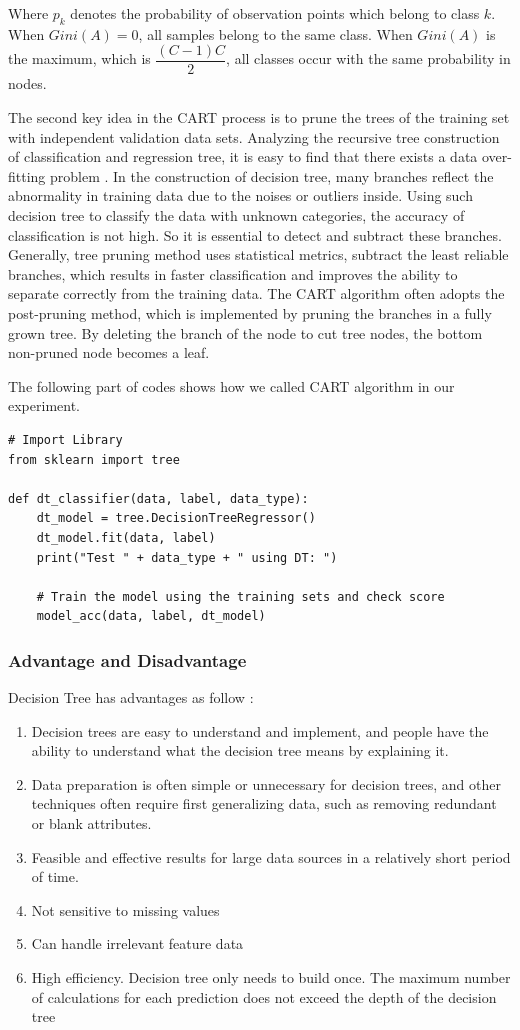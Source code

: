 \documentclass[sigconf]{acmart}
\begin{document}
Where $p_{k}$ denotes the probability of observation points which belong to class $k$. When $Gini(A)=0$, all samples belong to the same class. When $Gini(A)$ is the maximum, which is $\dfrac{(C-1)C}{2}$, all classes occur with the same probability in nodes.

The second key idea in the CART process is to prune the trees of the training set with independent validation data sets. Analyzing the recursive tree construction of classification and regression tree, it is easy to find that there exists a data over-fitting problem \cite{cart}. In the construction of decision tree, many branches reflect the abnormality in training data due to the noises or outliers inside. Using such decision tree to classify the data with unknown categories, the accuracy of classification is not high. So it is essential to detect and subtract these branches. Generally, tree pruning method uses statistical metrics, subtract the least reliable branches, which results in faster classification and improves the ability to separate correctly from the training data. The CART algorithm often adopts the post-pruning method, which is implemented by pruning the branches in a fully grown tree. By deleting the branch of the node to cut tree nodes, the bottom non-pruned node becomes a leaf.

The following part of codes shows how we called CART algorithm in our experiment.
\begin{lstlisting}
# Import Library
from sklearn import tree

def dt_classifier(data, label, data_type):
    dt_model = tree.DecisionTreeRegressor()
    dt_model.fit(data, label)
    print("Test " + data_type + " using DT: ")
    
    # Train the model using the training sets and check score
    model_acc(data, label, dt_model)
\end{lstlisting}

\subsubsection{Advantage and Disadvantage}

Decision Tree has advantages as follow \cite{DT}:
\begin{enumerate}
    \item Decision trees are easy to understand and implement, and people have the ability to understand what the decision tree means by explaining it.
    \item Data preparation is often simple or unnecessary for decision trees, and other techniques often require first generalizing data, such as removing redundant or blank attributes.
    \item Feasible and effective results for large data sources in a relatively short period of time.
    \item Not sensitive to missing values
    \item Can handle irrelevant feature data
    \item High efficiency. Decision tree only needs to build once. The maximum number of calculations for each prediction does not exceed the depth of the decision tree
\end{enumerate}
\end{document}
